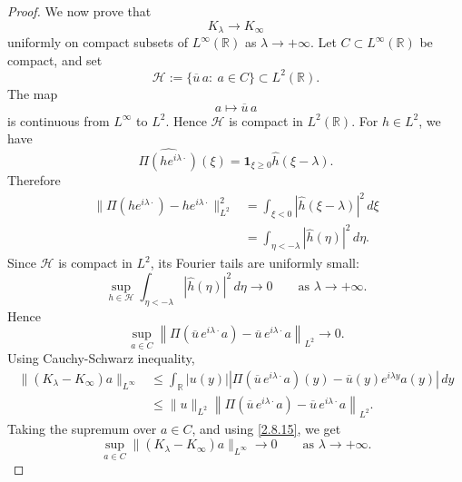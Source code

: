 \documentclass[10pt]{article}
\numberwithin{equation}{section}
\numberwithin{theorem}{section}
\begin{document}
\begin{proof}
We now prove that
\[
K_\lambda\to K_\infty
\]
uniformly on compact subsets of \(L^\infty(\mathbb R)\) as \(\lambda\to+\infty\). Let
\(C\subset L^\infty(\mathbb R)\) be compact, and set
\[
\mathcal H:=\{\overline u\,a:\ a\in C\}\subset L^2(\mathbb R).
\]
The map
\[
a\mapsto \overline u\,a
\]
is continuous from \(L^\infty\) to \(L^2\). Hence \(\mathcal H\) is compact in
\(L^2(\mathbb R)\). For \(h\in L^2\), we have
\[
\widehat{\Pi(h e^{i\lambda\cdot})}(\xi)
=
\mathbf 1_{\xi\ge0}\widehat h(\xi-\lambda).
\]
Therefore
\begin{equation}
\label{2.8.13}
\begin{aligned}
\|\Pi(h e^{i\lambda\cdot})-h e^{i\lambda\cdot}\|_{L^2}^2
&=
\int_{\xi<0}|\widehat h(\xi-\lambda)|^2\,d\xi  \\
&=
\int_{\eta<-\lambda}|\widehat h(\eta)|^2\,d\eta .
\end{aligned}
\end{equation}
Since \(\mathcal H\) is compact in \(L^2\), its Fourier tails are uniformly small:
\begin{equation}
\label{2.8.14}
\sup_{h\in\mathcal H}
\int_{\eta<-\lambda}|\widehat h(\eta)|^2\,d\eta
\longrightarrow0
\qquad\text{as }\lambda\to+\infty.
\end{equation}
Hence
\begin{equation}
\label{2.8.15}
\sup_{a\in C}
\left\|
\Pi(\overline u\,e^{i\lambda\cdot}a)
-
\overline u\,e^{i\lambda\cdot}a
\right\|_{L^2}
\longrightarrow0.
\end{equation}
Using Cauchy-Schwarz inequality,
\[
\begin{aligned}
\|(K_\lambda-K_\infty)a\|_{L^\infty}
&\le
\int_{\mathbb R}
|u(y)|
\left|
\Pi(\overline u\,e^{i\lambda\cdot}a)(y)
-
\overline u(y)e^{i\lambda y}a(y)
\right|\,dy  \\
&\le
\|u\|_{L^2}
\left\|
\Pi(\overline u\,e^{i\lambda\cdot}a)
-
\overline u\,e^{i\lambda\cdot}a
\right\|_{L^2}.
\end{aligned}
\]
Taking the supremum over \(a\in C\), and using \eqref{2.8.15}, we get
\begin{equation}
\label{2.8.16}
\sup_{a\in C}
\|(K_\lambda-K_\infty)a\|_{L^\infty}
\longrightarrow0
\qquad\text{as }\lambda\to+\infty.
\end{equation}


\end{proof}
\end{document}
